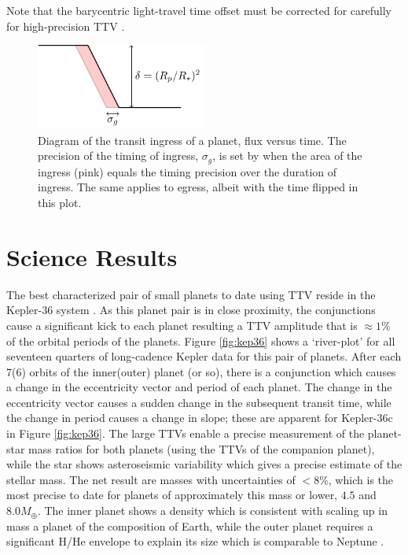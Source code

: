 \documentclass[graybox,natbib,nosecnum]{svmult}
\begin{document}
Note that the barycentric light-travel time offset must be corrected for carefully for high-precision
TTV \citep{2010PASP..122..935E}.

\begin{figure}
\centerline{
\includegraphics[width=0.5\textwidth]{ingress.pdf}}
%
\caption{Diagram of the transit ingress of a planet, flux versus time.  The precision of the timing of ingress, $\sigma_g$, is set by
when the area of the ingress (pink) equals the timing precision over the duration of ingress. The same applies to egress, albeit
with the time flipped in this plot.}
\label{fig:ingress}       %
\end{figure}

\section{Science Results}

The best characterized pair of small planets to date using TTV reside in the Kepler-36 system \citep{2012Sci...337..556C}.  As this planet pair is in close proximity, the conjunctions cause a significant kick to each planet resulting a TTV amplitude that is $\approx 1$\% of the orbital periods of the planets.  Figure \ref{fig:kep36} shows a `river-plot' for all seventeen quarters of long-cadence Kepler data for this pair of planets.  After each 7(6) orbits of the inner(outer) planet (or so), there is a conjunction which causes a change in the eccentricity vector and period of each planet.  The change in the eccentricity vector causes a sudden change in the subsequent transit time, while the change in period causes a change in slope;  these are apparent for Kepler-36c in Figure \ref{fig:kep36}.  The large TTVs enable a precise measurement of the planet-star mass ratios for both planets (using the TTVs of the companion planet), while the star shows asteroseismic variability which gives a precise estimate of the stellar mass.   The net result are masses with uncertainties of $<8$\%, which is the most precise to date for planets of approximately this mass or lower, $4.5$ and $8.0 M_\oplus$.  The inner planet shows a density which is consistent with scaling up in mass a planet of the composition of Earth, while the outer planet requires a significant H/He envelope to explain its size which is comparable to Neptune \citep{2012Sci...337..556C}.
\end{document}
